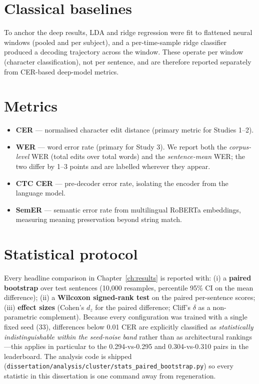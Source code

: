 \documentclass[11pt,a4paper]{report}
\begin{document}
\section{Classical baselines}
To anchor the deep results, LDA and ridge regression were fit to flattened
neural windows (pooled and per subject), and a per-time-sample ridge
classifier produced a decoding trajectory across the window. These operate
per window (character classification), not per sentence, and are therefore
reported separately from CER-based deep-model metrics.

\section{Metrics}
\label{sec:metrics}
\begin{itemize}
  \item \textbf{CER} --- normalised character edit distance (primary metric
  for Studies 1--2).
  \item \textbf{WER} --- word error rate (primary for Study 3). We report
  both the \emph{corpus-level} WER (total edits over total words) and the
  \emph{sentence-mean} WER; the two differ by 1--3 points and are labelled
  wherever they appear.
  \item \textbf{CTC CER} --- pre-decoder error rate, isolating the encoder
  from the language model.
  \item \textbf{SemER} --- semantic error rate from multilingual RoBERTa
  embeddings, measuring meaning preservation beyond string match.
\end{itemize}

\section{Statistical protocol}
\label{sec:stats}
Every headline comparison in Chapter~\ref{ch:results} is reported with:
(i) a \textbf{paired bootstrap} over test sentences (10{,}000 resamples,
percentile 95\% CI on the mean difference); (ii) a \textbf{Wilcoxon
signed-rank test} on the paired per-sentence scores; (iii) \textbf{effect
sizes} (Cohen's $d_z$ for the paired difference; Cliff's $\delta$ as a
non-parametric complement). Because every configuration was trained with a
single fixed seed (33), differences below 0.01 CER are explicitly classified
as \emph{statistically indistinguishable within the seed-noise band} rather
than as architectural rankings---this applies in particular to the
0.294-vs-0.295 and 0.304-vs-0.310 pairs in the leaderboard. The analysis
code is shipped (\texttt{dissertation/analysis/cluster/stats\_paired\_bootstrap.py})
so every statistic in this dissertation is one command away from
regeneration.
\end{document}
